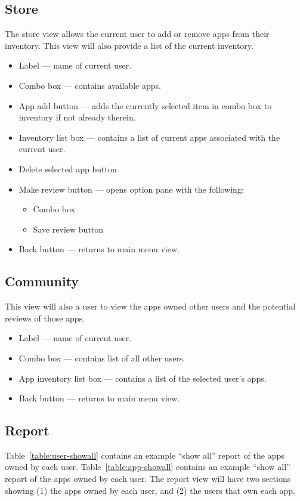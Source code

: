 \documentclass{article}
\begin{document}
\subsection{Store}
The store view allows the current user to add or remove apps from their inventory.
This view will also provide a list of the current inventory.

\begin{itemize}
    \item{Label}
        --- name of current user.
    \item{Combo box}
        --- contains available apps.
    \item{App add button}
        --- adds the currently selected item in combo box to inventory if not already therein.
    \item{Inventory list box}
        --- contains a list of current apps associated with the current user.
    \item{Delete selected app button}
    \item{Make review button}
        --- opens option pane with the following:
        \begin{itemize}
            \item{Combo box}
            \item{Save review button}
        \end{itemize}
    \item{Back button}
        --- returns to main menu view.
\end{itemize}

\subsection{Community}
This view will also a user to view the apps owned other users and the potential reviews of those apps.
\begin{itemize}
    \item{Label}
        --- name of current user.
    \item{Combo box}
        --- contains list of all other users.
    \item{App inventory list box}
        --- contains a list of the selected user's apps.
    \item{Back button}
        --- returns to main menu view.
\end{itemize}

\subsection{Report}
Table~\ref{table:user-showall} contains an example ``show all'' report of the apps owned by each user.
Table~\ref{table:app-showall} contains an example ``show all'' report of the apps owned by each user.
The report view will have two sections showing (1) the apps owned by each user, and (2) the users that own each app.
\end{document}
